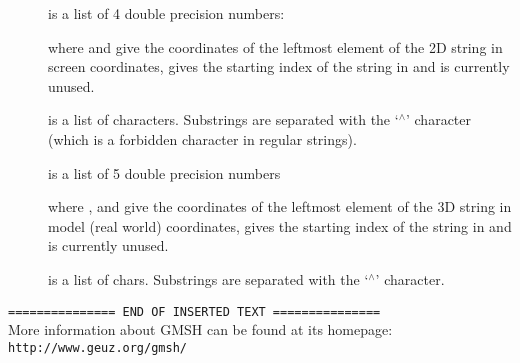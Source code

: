 \begin{description}
\item[]
is a list of 4 double precision numbers:
\begin{fileformat}
   
\end{fileformat}
where  and  give the coordinates of the leftmost
element of the 2D string in screen coordinates,  gives the
starting index of the string in  and  is
currently unused.

\item[]
is a list of  characters. Substrings are separated with
the `$^\wedge$' character (which is a forbidden character in regular strings).

\item[]
is a list of 5 double precision numbers
\begin{fileformat}
    
\end{fileformat}
where ,  and  give the coordinates of
the leftmost element of the 3D string in model (real world) coordinates,
 gives the starting index of the string in  and
 is currently unused.

\item[]
is a list of  chars. Substrings are separated with the
`$^\wedge$' character.
\end{description}
 
{\tt =============== END OF INSERTED TEXT ===============}\\[0.5em]

More information about GMSH can be found at its homepage:\\
{\tt http://www.geuz.org/gmsh/}\\

